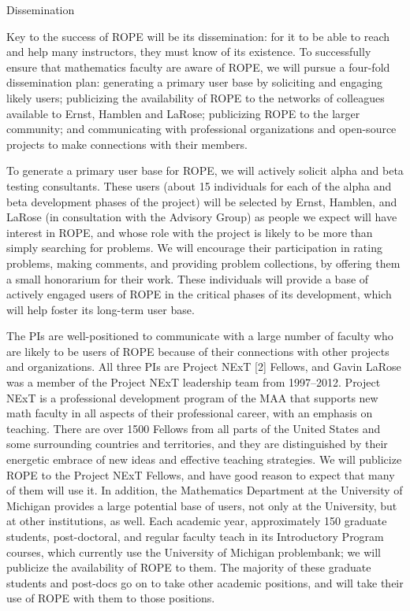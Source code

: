 \documentclass[11pt]{article}
\begin{document}
\begin{section}{Dissemination}

Key to the success of ROPE will be its dissemination: for it to be able
to reach and help many instructors, they must know of its existence.  To
successfully ensure that mathematics faculty are aware of ROPE, we will
pursue a four-fold dissemination plan: generating a primary user base by
soliciting and engaging likely users; publicizing the availability of ROPE to the networks of colleagues available to Ernst, Hamblen and
LaRose; publicizing ROPE to the larger community; and communicating
with professional organizations and open-source projects to make
connections with their members.

To generate a primary user base for ROPE, we will actively solicit
alpha and beta testing consultants.  These users (about 15
individuals for each of the alpha and beta development phases of the
project) will be selected by Ernst, Hamblen, and LaRose (in consultation
with the Advisory Group) as people we expect will have interest in ROPE, and whose role with the project is likely to be more than simply
searching for problems.  We will encourage their participation in rating
problems, making comments, and providing problem collections, by offering them a
small honorarium for their work.  These individuals will provide a
base of actively engaged users of ROPE in the critical phases
of its development, which will help foster its long-term user base.

The PIs are well-positioned to communicate
with a large number of faculty who are likely to be users of ROPE
because of their connections with other projects and organizations.  All
three PIs are Project NExT [2]
Fellows, and Gavin LaRose was a member of the Project NExT leadership team
from 1997--2012.
Project NExT is a professional development program of the MAA that
supports new math faculty in all aspects of their professional career,
with an emphasis on teaching.  There are over 1500 Fellows from all parts
of the United States and some surrounding countries and territories, and
they are distinguished by their energetic embrace of new ideas and
effective teaching strategies.  We will publicize ROPE to the Project
NExT Fellows, and have good reason to expect that many of them will use
it.  In addition, the Mathematics Department at 
the University of Michigan provides a large potential base of users, not
only at the University, but at other institutions, as well.  Each academic
year, approximately 150 graduate students, post-doctoral, and regular
faculty teach in its Introductory Program courses, which currently use the
University of Michigan problembank; we will publicize
the availability of ROPE to them.  The majority of these graduate
students and post-docs go on to take other academic positions, and will
take their use of ROPE with them to those positions.


\end{section}
\end{document}
